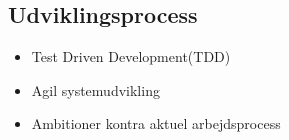 \subsection{Udviklingsprocess}
\begin{frame}
  \begin{itemize}
    \item Test Driven Development(TDD)
    \item Agil systemudvikling
    \item Ambitioner kontra aktuel arbejdsprocess
  \end{itemize}
\end{frame}